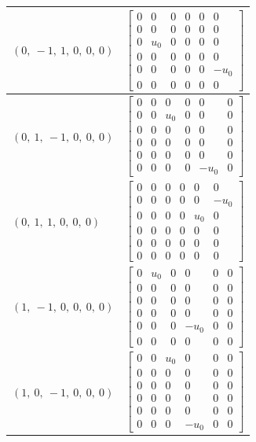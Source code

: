 \documentclass[11pt]{article}
\theoremstyle{definition}
\begin{document}
\begin{longtable}{|l|c|}
    \hline
    $\left( 0, \  -1, \  1, \  0, \  0, \  0\right)$ & ${\left[\begin{matrix}0 & 0 & 0 & 0 & 0 & 0\\0 & 0 & 0 & 0 & 0 & 0\\0 & u_{0} & 0 & 0 & 0 & 0\\0 & 0 & 0 & 0 & 0 & 0\\0 & 0 & 0 & 0 & 0 & - u_{0}\\0 & 0 & 0 & 0 & 0 & 0\end{matrix}\right]}$ \\
    \hline
    $\left( 0, \  1, \  -1, \  0, \  0, \  0\right)$ & ${\left[\begin{matrix}0 & 0 & 0 & 0 & 0 & 0\\0 & 0 & u_{0} & 0 & 0 & 0\\0 & 0 & 0 & 0 & 0 & 0\\0 & 0 & 0 & 0 & 0 & 0\\0 & 0 & 0 & 0 & 0 & 0\\0 & 0 & 0 & 0 & - u_{0} & 0\end{matrix}\right]}$ \\
    \hline
    $\left( 0, \  1, \  1, \  0, \  0, \  0\right)$ & ${\left[\begin{matrix}0 & 0 & 0 & 0 & 0 & 0\\0 & 0 & 0 & 0 & 0 & - u_{0}\\0 & 0 & 0 & 0 & u_{0} & 0\\0 & 0 & 0 & 0 & 0 & 0\\0 & 0 & 0 & 0 & 0 & 0\\0 & 0 & 0 & 0 & 0 & 0\end{matrix}\right]}$ \\
    \hline
    $\left( 1, \  -1, \  0, \  0, \  0, \  0\right)$ & ${\left[\begin{matrix}0 & u_{0} & 0 & 0 & 0 & 0\\0 & 0 & 0 & 0 & 0 & 0\\0 & 0 & 0 & 0 & 0 & 0\\0 & 0 & 0 & 0 & 0 & 0\\0 & 0 & 0 & - u_{0} & 0 & 0\\0 & 0 & 0 & 0 & 0 & 0\end{matrix}\right]}$ \\
    \hline
    $\left( 1, \  0, \  -1, \  0, \  0, \  0\right)$ & ${\left[\begin{matrix}0 & 0 & u_{0} & 0 & 0 & 0\\0 & 0 & 0 & 0 & 0 & 0\\0 & 0 & 0 & 0 & 0 & 0\\0 & 0 & 0 & 0 & 0 & 0\\0 & 0 & 0 & 0 & 0 & 0\\0 & 0 & 0 & - u_{0} & 0 & 0\end{matrix}\right]}$ \\

\end{longtable}
\end{document}
